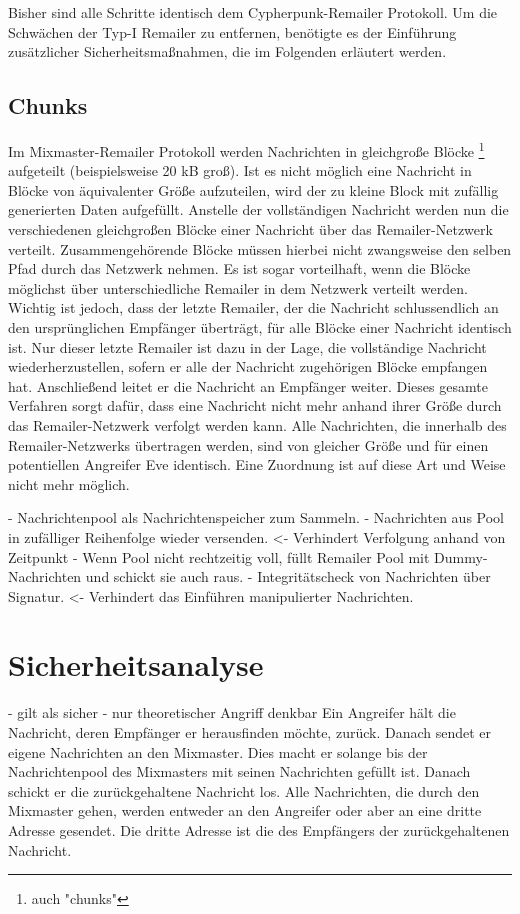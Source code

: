 Bisher sind alle Schritte identisch dem Cypherpunk-Remailer Protokoll. Um die Schwächen der Typ-I Remailer zu entfernen, benötigte es der Einführung zusätzlicher Sicherheitsmaßnahmen, die im Folgenden erläutert werden.

\subsection{Chunks}
Im Mixmaster-Remailer Protokoll werden Nachrichten in gleichgroße Blöcke \footnote{auch "chunks"} aufgeteilt (beispielsweise 20 kB groß). Ist es nicht möglich eine Nachricht in Blöcke von äquivalenter Größe aufzuteilen, wird der zu kleine Block mit zufällig generierten Daten aufgefüllt. Anstelle der vollständigen Nachricht werden nun die verschiedenen gleichgroßen Blöcke einer Nachricht über das Remailer-Netzwerk verteilt. Zusammengehörende Blöcke müssen hierbei nicht zwangsweise den selben Pfad durch das Netzwerk nehmen. Es ist sogar vorteilhaft, wenn die Blöcke möglichst über unterschiedliche Remailer in dem Netzwerk verteilt werden. Wichtig ist jedoch, dass der letzte Remailer, der die Nachricht schlussendlich an den ursprünglichen Empfänger überträgt, für alle Blöcke einer Nachricht identisch ist. Nur dieser letzte Remailer ist dazu in der Lage, die vollständige Nachricht wiederherzustellen, sofern er alle der Nachricht zugehörigen Blöcke empfangen hat. Anschließend leitet er die Nachricht an Empfänger weiter. Dieses gesamte Verfahren sorgt dafür, dass eine Nachricht nicht mehr anhand ihrer Größe durch das Remailer-Netzwerk verfolgt werden kann. Alle Nachrichten, die innerhalb des Remailer-Netzwerks übertragen werden, sind von gleicher Größe und für einen potentiellen Angreifer Eve identisch. Eine Zuordnung ist auf diese Art und Weise nicht mehr möglich.

- Nachrichtenpool als Nachrichtenspeicher zum Sammeln.
- Nachrichten aus Pool in zufälliger Reihenfolge wieder versenden. <- Verhindert Verfolgung anhand von Zeitpunkt
- Wenn Pool nicht rechtzeitig voll, füllt Remailer Pool mit Dummy-Nachrichten und schickt sie auch raus.
- Integritätscheck von Nachrichten über Signatur. <- Verhindert das Einführen manipulierter Nachrichten.

\section{Sicherheitsanalyse}
- gilt als sicher
- nur theoretischer Angriff denkbar
Ein Angreifer hält die Nachricht, deren Empfänger er herausfinden möchte, zurück. Danach sendet er eigene Nachrichten an den Mixmaster. Dies macht er solange bis der Nachrichtenpool des Mixmasters mit seinen Nachrichten gefüllt ist. Danach schickt er die zurückgehaltene Nachricht los. Alle Nachrichten, die durch den Mixmaster gehen, werden entweder an den Angreifer oder aber an eine dritte Adresse gesendet. Die dritte Adresse ist die des Empfängers der zurückgehaltenen Nachricht.